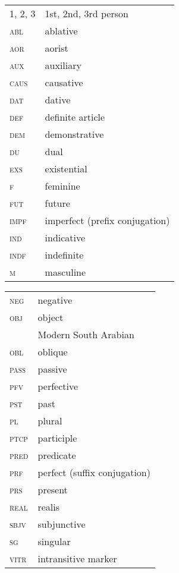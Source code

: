 \documentclass[output=paper]{langsci/langscibook}
\begin{document}
\begin{tabularx}{.5\textwidth}{@{}lQ@{}}
\textsc{1, 2, 3} & 1st, 2nd, 3rd person \\
\textsc{abl} & ablative \\
\textsc{aor} & aorist \\
\textsc{aux} & auxiliary \\
\textsc{caus} & {causative} \\
\textsc{dat} & dative \\
\textsc{def} & {definite} {article} \\
\textsc{dem} & demonstrative \\
\textsc{du} & dual \\
\textsc{exs} & {existential} \\
\textsc{f} & feminine \\
\textsc{fut} & {future} \\
\textsc{impf} & imperfect (prefix conjugation) \\
\textsc{ind} & indicative \\
\textsc{indf} & indefinite \\
\textsc{m} & masculine \\
\end{tabularx}%
\begin{tabularx}{.5\textwidth}{@{}lQ@{}}
\textsc{neg} & negative \\
\textsc{obj} & object \\
 & Modern {South Arabian} \\
\textsc{obl} & oblique \\
\textsc{pass} & {passive} \\
\textsc{pfv} & perfective \\
\textsc{pst} & past \\
\textsc{pl} & plural \\
\textsc{ptcp} & {participle} \\
\textsc{pred} & predicate \\
\textsc{prf} & perfect (suffix conjugation) \\
\textsc{prs} & present \\
\textsc{real} & realis \\
\textsc{sbjv} & subjunctive \\
\textsc{sg} & singular \\
\textsc{vitr} & intransitive marker \\
\end{tabularx}%



{\sloppy\printbibliography[heading=subbibliography,notkeyword=this]}
\end{document}
